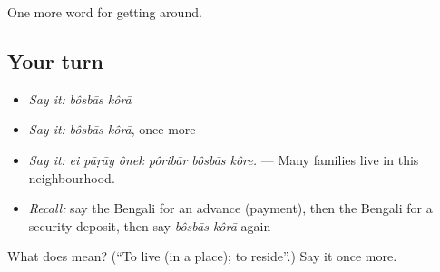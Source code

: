 \begin{grammarlens}[title={What you've built}]
One more word for getting around.
\end{grammarlens}

\subsection*{Your turn}
\begin{itemize}
\raggedright
  \item \emph{Say it:} \emph{bôsbās kôrā}
  \item \emph{Say it:} \emph{bôsbās kôrā}, once more
  \item \emph{Say it:} \emph{ei pāṛāy ônek pôribār bôsbās kôre.} — Many families live in this neighbourhood.
  \item \emph{Recall:} say the Bengali for an advance (payment), then the Bengali for a security deposit, then say \emph{bôsbās kôrā} again
\end{itemize}

\begin{tcolorbox}[breakable,colback=teal!4,colframe=teal!35!black,title={Before you move on}]
What does   mean? (\textquotedblleft{}To live (in a place); to reside\textquotedblright{}.) Say it once more.
\end{tcolorbox}
